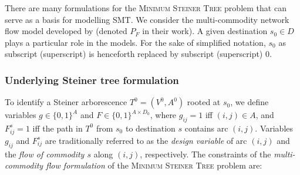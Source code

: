 There are many formulations for the \textsc{Minimum Steiner Tree} problem \citep{goemans93catalog} that can serve as a basis for modelling SMT.
We consider the multi-commodity network flow model developed by \citet{Polzin} (denoted $P_{F}$ in their work).
A given destination $s_0\in D$ plays a particular role in the models.
For the sake of simplified notation, $s_0$ as subscript (superscript) is henceforth replaced by subscript (superscript) 0.

\subsubsection{Underlying Steiner tree formulation}

To identify a Steiner arborescence $T^0=(V^0,A^0)$ rooted at $s_0$, we define variables $g\in\{0,1\}^A$ and $F\in\{0,1\}^{A\times D_0}$,
where $g_{ij}=1$ iff $(i,j)\in A$, and $F_{ij}^s=1$ iff  the path in $T^0$ from $s_0$ to destination $s$ contains arc $(i,j)$.
%
Variables $g_{ij}$ and $F_{ij}^s$ are traditionally referred to as the \emph{design variable} of arc $(i,j)$ and the
\emph{flow of commodity $s$} along $(i,j)$, respectively.
The constraints of the \emph{multi-commodity flow formulation}
of the \textsc{Minimum Steiner Tree} problem are:
